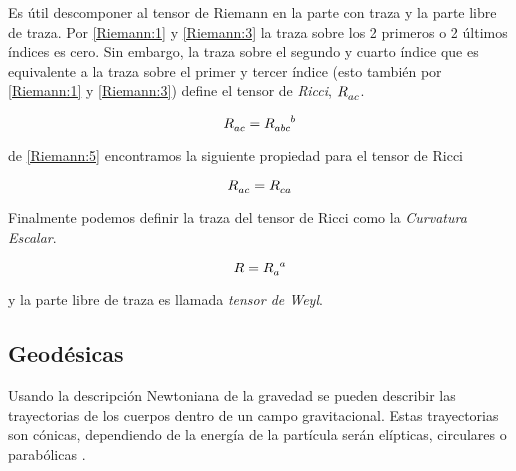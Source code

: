 \documentclass[../Main.tex]{subfiles}
\begin{document}
Es útil descomponer al tensor de Riemann en la parte con traza y la parte libre de traza. Por \eqref{Riemann:1} y \eqref{Riemann:3} la traza sobre los 2 primeros o 2 últimos índices es cero. Sin embargo, la traza sobre el segundo y cuarto índice que es equivalente a la traza sobre el primer y tercer índice (esto también por \eqref{Riemann:1} y \eqref{Riemann:3}) define el tensor de \textit{Ricci}, $\tensor{R}{_{ac}}$.

\begin{equation}
    \tensor{R}{_{ac}} = \tensor{R}{_{abc}^{b}}
\end{equation}

de \eqref{Riemann:5} encontramos la siguiente propiedad para el tensor de Ricci

\begin{equation}
    \tensor{R}{_{ac}} = \tensor{R}{_{ca}}
\end{equation}

Finalmente podemos definir la traza del tensor de Ricci como la \textit{Curvatura Escalar}.

\begin{equation}
    R = \tensor{R}{_{a}^{a}}
\end{equation}

y la parte libre de traza es llamada \textit{tensor de Weyl}.

\subsection{Geodésicas}
Usando la descripción Newtoniana de la gravedad se pueden describir las trayectorias de los cuerpos dentro de un campo gravitacional. Estas trayectorias son cónicas, dependiendo de la energía de la partícula serán elípticas, circulares o parabólicas \cite{Landau1976Mechanics}.
\end{document}
